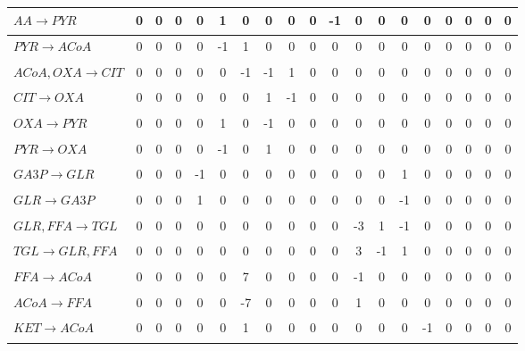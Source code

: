 \documentclass{IEEEtran}
\begin{document}
\begin{table}[H]
{\begin{tabular}{c|c|c|c|c|c|c|c|c|c|c|c|c|c|c|c|c|c|c|}
\multicolumn{1}{|l|}{$AA \xrightarrow[]{} PYR$}       & 0   & 0   & 0   & 0    & 1   & 0    & 0   & 0   & 0   & -1 & 0   & 0   & 0   & 0   & 0 & 0 & 0 & 0  \\ \hline
\multicolumn{1}{|l|}{$PYR \xrightarrow[]{} ACoA$}     & 0   & 0   & 0   & 0    & -1  & 1    & 0   & 0   & 0   & 0  & 0   & 0   & 0   & 0   & 0 & 0 & 0 & 0  \\ \hline
\multicolumn{1}{|l|}{$ACoA,OXA \xrightarrow[]{} CIT$} & 0   & 0   & 0   & 0    & 0   & -1   & -1  & 1   & 0   & 0  & 0   & 0   & 0   & 0   & 0 & 0 & 0 & 0  \\ \hline
\multicolumn{1}{|l|}{$CIT \xrightarrow[]{} OXA$}      & 0   & 0   & 0   & 0    & 0   & 0    & 1   & -1  & 0   & 0  & 0   & 0   & 0   & 0   & 0 & 0  & 0 & 0 \\ \hline
\multicolumn{1}{|l|}{$OXA \xrightarrow[]{} PYR$}      & 0   & 0   & 0   & 0    & 1   & 0    & -1  & 0   & 0   & 0  & 0   & 0   & 0   & 0   & 0 & 0 & 0 & 0  \\ \hline
\multicolumn{1}{|l|}{$PYR \xrightarrow[]{} OXA$}      & 0   & 0   & 0   & 0    & -1  & 0    & 1   & 0   & 0   & 0  & 0   & 0   & 0   & 0   & 0 & 0  & 0 & 0 \\ \hline
\multicolumn{1}{|l|}{$GA3P \xrightarrow[]{} GLR$}     & 0   & 0   & 0   & -1   & 0   & 0    & 0   & 0   & 0   & 0  & 0   & 0   & 1   & 0   & 0 & 0  & 0 & 0 \\ \hline
\multicolumn{1}{|l|}{$GLR \xrightarrow[]{} GA3P$}     & 0   & 0   & 0   & 1    & 0   & 0    & 0   & 0   & 0   & 0  & 0   & 0   & -1  & 0   & 0 & 0  & 0 & 0 \\ \hline
\multicolumn{1}{|l|}{$GLR,FFA \xrightarrow[]{} TGL$}  & 0   & 0   & 0   & 0    & 0   & 0    & 0   & 0   & 0   & 0  & -3  & 1   & -1  & 0   & 0 & 0  & 0 & 0 \\ \hline
\multicolumn{1}{|l|}{$TGL \xrightarrow[]{} GLR,FFA$}  & 0   & 0   & 0   & 0    & 0   & 0    & 0   & 0   & 0   & 0  & 3   & -1  & 1   & 0   & 0 & 0  & 0 & 0 \\ \hline
\multicolumn{1}{|l|}{$FFA \xrightarrow[]{} ACoA$}     & 0   & 0   & 0   & 0    & 0   & 7    & 0   & 0   & 0   & 0  & -1  & 0   & 0   & 0   & 0 & 0 & 0 & 0  \\ \hline
\multicolumn{1}{|l|}{$ACoA \xrightarrow[]{} FFA$}     & 0   & 0   & 0   & 0    & 0   & -7   & 0   & 0   & 0   & 0  & 1   & 0   & 0   & 0   & 0 & 0  & 0 & 0 \\ \hline
\multicolumn{1}{|l|}{$KET \xrightarrow[]{} ACoA$}     & 0   & 0   & 0   & 0    & 0   & 1    & 0   & 0   & 0   & 0  & 0   & 0   & 0   & -1  & 0 & 0  & 0 & 0 \\ \hline

\end{tabular}}
\end{table}
\end{document}
